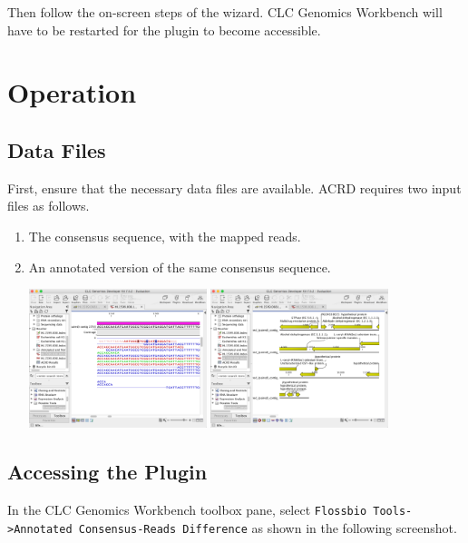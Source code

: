 \documentclass[12pt,letterpaper]{article}
\begin{document}
Then follow the on-screen steps of the wizard.  CLC Genomics Workbench will
have to be restarted for the plugin to become accessible.

\section{Operation}

\subsection{Data Files}

First, ensure that the necessary data files are available.  ACRD requires two
input files as follows.

\begin{enumerate}
    \item
    The consensus sequence, with the mapped reads.

    \item
    An annotated version of the same consensus sequence.
    \begin{center}
        \includegraphics[width=14em]{consensus_mapped_reads.png}
        \includegraphics[width=14em]{annotated_sequence.png}
    \end{center}

\end{enumerate}


\subsection{Accessing the Plugin}

In the CLC Genomics Workbench toolbox pane, select \texttt{Flossbio
Tools->Annotated Consensus-Reads Difference} as shown in the following
screenshot.
\end{document}
